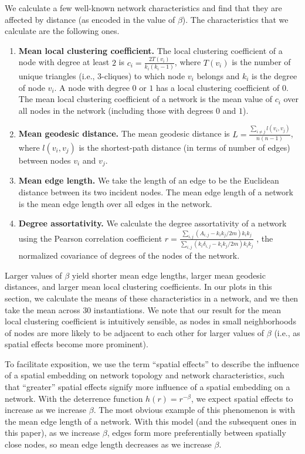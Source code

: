 \documentclass[%
 reprint,
 amsmath,amssymb,
 aps,
]{revtex4-1}
\begin{document}
We calculate a few well-known network characteristics \cite{newman2018} and find that they are affected by distance (as encoded in the value of $\beta$). The characteristics that we calculate are the following ones.
\begin{enumerate}\label{characteristics_definitions}
    \item {\bf Mean local clustering coefficient.} The local clustering coefficient of a node with degree at least $2$ is $c_i = \frac{2T(v_i)}{k_i(k_i - 1)}$, where $T(v_i)$ is the number of unique triangles (i.e., $3$-cliques) to which node $v_i$ belongs and $k_i$ is the degree of node $v_i$. A node with degree $0$ or $1$ has a local clustering coefficient of $0$. The mean local clustering coefficient of a network is the mean value of $c_i$ over all nodes in the network (including those with degrees $0$ and $1$). 
    \item {\bf Mean geodesic distance.} The mean geodesic distance is  $L = \frac{\sum_{i \neq j}l(v_i, v_j)}{n(n-1)}$, where $l(v_i, v_j)$ is the shortest-path distance (in terms of number of edges) between nodes $v_i$ and $v_j$.
    \item {\bf Mean edge length.} We take the length of an edge to be the Euclidean distance between its two incident nodes. The mean edge length of a network is the mean edge length over all edges in the network.
    \item {\bf Degree assortativity.} We calculate the degree assortativity of a network using the Pearson correlation coefficient $r = \frac{\sum_{i,j}(A_{i,j}-k_i k_j/2m)k_i k_j}{\sum_{i,j}(k_i \delta_{i,j}-k_i k_j/2m)k_i k_j}$ \cite{newman2018}, the normalized covariance of degrees of the nodes of the network.
\end{enumerate}


Larger values of $\beta$ yield shorter mean edge lengths, larger mean geodesic distances, and larger mean local clustering coefficients. In our plots in this section, we calculate the means of these characteristics in a network, and we then take the mean across 30 instantiations. We note that our result for the mean local clustering coefficient is intuitively sensible, as nodes in small neighborhoods of nodes are more likely to be adjacent to each other for larger values of $\beta$ (i.e., as spatial effects become more prominent). 

To facilitate exposition, we use the term ``spatial effects'' to describe the influence of a spatial embedding on network topology and network characteristics, such that ``greater'' spatial effects signify more influence of a spatial embedding on a network. With the deterrence function $h(r) = r^{-\beta}$, we expect spatial effects to increase as we increase $\beta$. The most obvious example of this phenomenon is with the mean edge length of a network. With this model (and the subsequent ones in this paper), as we increase $\beta$, edges form more preferentially between spatially close nodes, so mean edge length decreases as we increase $\beta$. 
\end{document}
